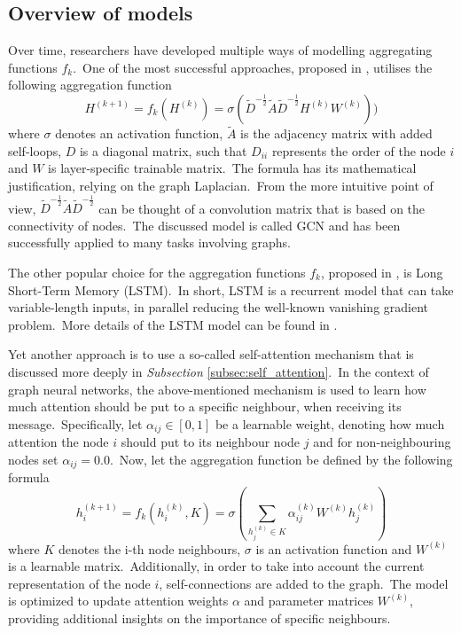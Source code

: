 \documentclass[longabstract, english, mgr]{iithesis}
\theoremstyle{default_theorem_style}\newtheorem{theorem}{Theorem}
\theoremstyle{default_theorem_style}\newtheorem{definition}{Definition}
\begin{document}
\subsection{Overview of models}

Over time, researchers have developed multiple ways of modelling aggregating functions $f_k$.\ One of the most
successful approaches, proposed in \cite{gcn_model}, utilises the following aggregation function
$$
H^{(k + 1)} = f_k(H^{(k)}) = \sigma(\tilde{D}^{-\frac{1}{2}} \tilde{A} \tilde{D}^{-\frac{1}{2}} H^{(k)} W^{(k)}))
$$
where $\sigma$ denotes an activation function, $\tilde{A}$ is the adjacency matrix with added self-loops, $D$ is
a diagonal matrix, such that $D_{ii}$ represents the order of the node $i$ and $W$ is layer-specific trainable
matrix.\ The formula has its mathematical justification, relying on the graph Laplacian.\ From the more intuitive
point of view, $\tilde{D}^{-\frac{1}{2}} \tilde{A} \tilde{D}^{-\frac{1}{2}}$ can be thought of a convolution matrix
that is based on the connectivity of nodes.\ The discussed model is called GCN and has been successfully applied
to many tasks involving graphs.\newline

\noindent The other popular choice for the aggregation functions $f_k$, proposed in \cite{graphsage}, is
Long Short-Term Memory (LSTM).\ In short, LSTM is a recurrent model that can take variable-length
inputs, in parallel reducing the well-known vanishing gradient problem.\ More details of the LSTM model can be found
in \cite{goodfellow_book}.\newline

\noindent Yet another approach is to use a so-called self-attention mechanism that is discussed more deeply in
\textit{Subsection} \ref{subsec:self_attention}.\ In the context of graph neural networks, the above-mentioned
mechanism is used to learn how much attention should be put to a specific neighbour, when receiving its
message.\ Specifically, let $\alpha_{ij} \in [0, 1]$ be a learnable weight, denoting how much attention the node
$i$ should put to its neighbour node $j$ and for non-neighbouring nodes set $\alpha_{ij} = 0.0$.\ Now, let the
aggregation function be defined by the following formula
$$
h_i^{(k + 1)} = f_k(h_i^{(k)}, K) = \sigma(\sum_{h_j^{(k)} \in K} \alpha_{ij}^{(k)} W^{(k)} h_j^{(k)})
$$
where $K$ denotes the i-th node neighbours, $\sigma$ is an activation function and $W^{(k)}$ is a learnable
matrix.\ Additionally, in order to take into account the current representation of the node $i$, self-connections
are added to the graph.\ The model is optimized to update attention weights $\alpha$ and parameter matrices
$W^{(k)}$, providing additional insights on the importance of specific neighbours.\newline
\end{document}
